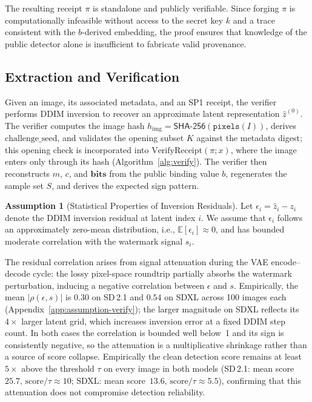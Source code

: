 \documentclass{article}
\theoremstyle{plain}
\theoremstyle{definition}
\newtheorem{assumption}[theorem]{Assumption}
\theoremstyle{remark}
\begin{document}
The resulting receipt \(\pi\) is standalone and publicly verifiable. Since forging \(\pi\) is computationally infeasible without access to the secret key \(k\) and a trace consistent with the $b$-derived embedding, the proof ensures that knowledge of the public detector alone is insufficient to fabricate valid provenance.

\subsection{Extraction and Verification}
Given an image, its associated metadata, and an SP1 receipt, the verifier performs DDIM
inversion to recover an approximate latent representation \(\hat{z}^{(0)}\). The verifier
computes the image hash \(h_{\mathrm{img}} = \mathsf{SHA\text{-}256}(\texttt{pixels}(I))\), derives
\(\mathrm{challenge\_seed}\), and validates the opening subset \(K\) against the metadata
digest; this opening check is incorporated into
\(\text{VerifyReceipt}(\pi; x)\), where the image enters only through its hash (Algorithm~\ref{alg:verify}). The verifier then reconstructs \(m\), \(c\), and
\(\mathbf{bits}\) from the public binding value \(b\), regenerates the sample set \(S\), and
derives the expected sign pattern.

\begin{assumption}[Statistical Properties of Inversion Residuals]
\label{assum:noise}
Let \(\epsilon_i = \hat{z}_i - z_i\) denote the DDIM inversion residual at latent index \(i\).
We assume that \(\epsilon_i\) follows an approximately zero-mean distribution, i.e.,
\(\mathbb{E}[\epsilon_i] \approx 0\), and has bounded moderate correlation with the
watermark signal \(s_i\).
\end{assumption}

The residual correlation arises from signal attenuation during the VAE encode--decode cycle: the lossy pixel-space roundtrip partially absorbs the watermark perturbation, inducing a negative correlation between \(\epsilon\) and \(s\). Empirically, the mean \(|\rho(\epsilon, s)|\) is \(0.30\) on SD\,2.1 and \(0.54\) on SDXL across 100 images each (Appendix~\ref{app:assumption-verify}); the larger magnitude on SDXL reflects its \(4{\times}\) larger latent grid, which increases inversion error at a fixed DDIM step count. In both cases the correlation is bounded well below~1 and its sign is consistently negative, so the attenuation is a multiplicative shrinkage rather than a source of score collapse. Empirically the clean detection score remains at least \(5{\times}\) above the threshold \(\tau\) on every image in both models (SD\,2.1: mean score~\(25.7\), \(\mathrm{score}/\tau \approx 10\); SDXL: mean score~\(13.6\), \(\mathrm{score}/\tau \approx 5.5\)), confirming that this attenuation does not compromise detection reliability.
\end{document}
